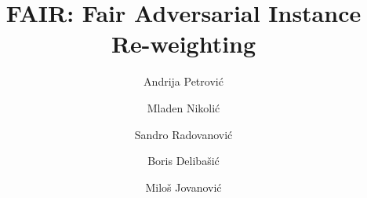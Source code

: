 \documentclass[preprint,12pt]{elsarticle}
\begin{document}
\begin{frontmatter}



\title{FAIR: Fair Adversarial Instance Re-weighting}
\tnotetext[label1]{}


\author[FON]{Andrija Petrović}
\author[MATF]{Mladen Nikolić}
\author[FON]{Sandro Radovanović}
\author[FON]{Boris Delibašić}
\author[FON]{Miloš Jovanović}

\address[FON]{University of Belgrade - Faculty of Organizational Sciences, Jove Ilica 154, Belgrade, Serbia}
\address[MATF]{University of Belgrade - Faculty of Mathematics, Studentski Trg 16, Belgrade, Serbia}




\end{frontmatter}
\end{document}
